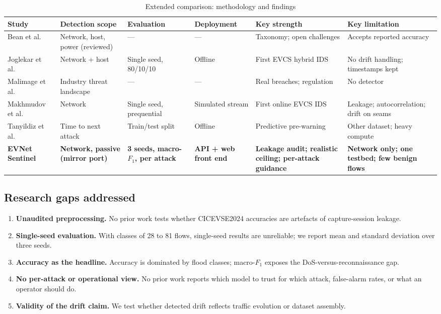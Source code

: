 \documentclass[conference]{IEEEtran}
\begin{document}
\begin{table}[!t]
\caption{Extended comparison: methodology and findings}
\label{tab:comparison_ext}
\centering
\footnotesize
\begin{tabular}{p{2.3cm}p{2.4cm}p{2.3cm}p{2.0cm}p{3.0cm}p{3.0cm}}
\toprule
\textbf{Study} & \textbf{Detection scope} & \textbf{Evaluation} & \textbf{Deployment} & \textbf{Key strength} & \textbf{Key limitation} \\
\midrule
Bean et al.\ \cite{b1} & Network, host, power (reviewed) & --- & --- & Taxonomy; open challenges & Accepts reported accuracy \\
Joglekar et al.\ \cite{b2} & Network + host & Single seed, 80/10/10 & Offline & First EVCS hybrid IDS & No drift handling; timestamps kept \\
Malimage et al.\ \cite{b3} & Industry threat landscape & --- & --- & Real breaches; regulation & No detector \\
Makhmudov et al.\ \cite{b4} & Network & Single seed, prequential & Simulated stream & First online EVCS IDS & Leakage; autocorrelation; drift on seams \\
Tanyildiz et al.\ \cite{b5} & Time to next attack & Train/test split & Offline & Predictive pre-warning & Other dataset; heavy compute \\
\midrule
\textbf{EVNet Sentinel} & \textbf{Network, passive (mirror port)} & \textbf{3 seeds, macro-$F_1$, per attack} & \textbf{API + web front end} & \textbf{Leakage audit; realistic ceiling; per-attack guidance} & \textbf{Network only; one testbed; few benign flows} \\
\bottomrule
\end{tabular}
\end{table}

\subsection{Research gaps addressed}

\begin{enumerate}
    \item \textbf{Unaudited preprocessing.} No prior work tests whether CICEVSE2024 accuracies are artefacts of capture-session leakage.
    \item \textbf{Single-seed evaluation.} With classes of 28 to 81 flows, single-seed results are unreliable; we report mean and standard deviation over three seeds.
    \item \textbf{Accuracy as the headline.} Accuracy is dominated by flood classes; macro-$F_1$ exposes the DoS-versus-reconnaissance gap.
    \item \textbf{No per-attack or operational view.} No prior work reports which model to trust for which attack, false-alarm rates, or what an operator should do.
    \item \textbf{Validity of the drift claim.} We test whether detected drift reflects traffic evolution or dataset assembly.
\end{enumerate}
\end{document}
